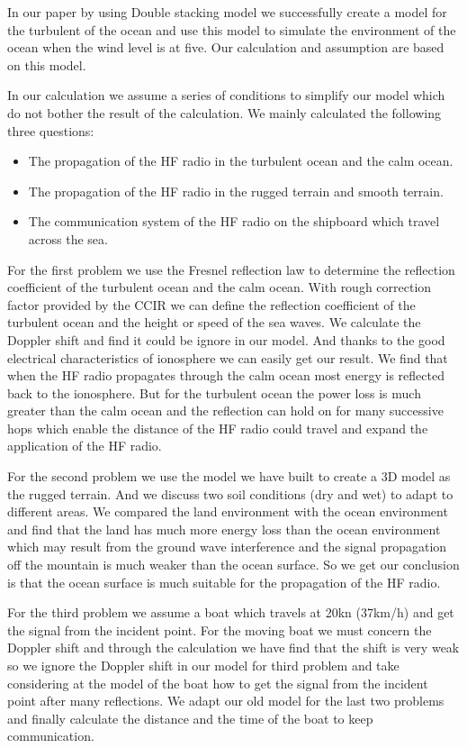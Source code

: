 \documentclass{mcmthesis}
\begin{document}
In our paper by using Double stacking model we successfully create a model for the turbulent of the ocean and use this model to simulate the environment of the ocean when the wind level is at five. Our calculation and assumption are based on this model.

In our calculation we assume a series of conditions to simplify our model which do not bother the result of the calculation. We mainly calculated the following three questions:
 \begin{itemize}
 \item The propagation of the HF radio in the turbulent ocean and the calm ocean.
 \item The propagation of the HF radio in the rugged terrain and smooth terrain.
 \item The communication system of the HF radio on the shipboard which travel across the sea.
 \end{itemize}

For the first problem we use the Fresnel reflection law to determine the reflection coefficient of the turbulent ocean and the calm ocean. With rough correction factor provided by the CCIR we can define the reflection coefficient of the turbulent ocean and the height or speed of the sea waves. We calculate the Doppler shift and find it could be ignore in our model. And thanks to the good electrical characteristics of ionosphere we can easily get our result. We find that when the HF radio propagates through the calm ocean most energy is reflected back to the ionosphere. But for the turbulent ocean the power loss is much greater than the calm ocean and the reflection can hold on for many successive hops which enable the distance of the HF radio could travel and expand the application of the HF radio.

For the second problem we use the model we have built to create a 3D model as the rugged terrain. And we discuss two soil conditions (dry and wet) to adapt to different areas. We compared the land environment with the ocean environment and find that the land has much more energy loss than the ocean environment which may result from the ground wave interference and the signal propagation off the mountain is much weaker than the ocean surface. So we get our conclusion is that the ocean surface is much suitable for the propagation of the HF radio.

For the third problem we assume a boat which travels at 20kn (37km/h) and get the signal from the incident point. For the moving boat we must concern the Doppler shift and through the calculation we have find that the shift is very weak so we ignore the Doppler shift in our model for third problem and take considering at the model of the boat how to get the signal from the incident point after many reflections. We adapt our old model for the last two problems and finally calculate the distance and the time of the boat to keep communication.
\end{document}
